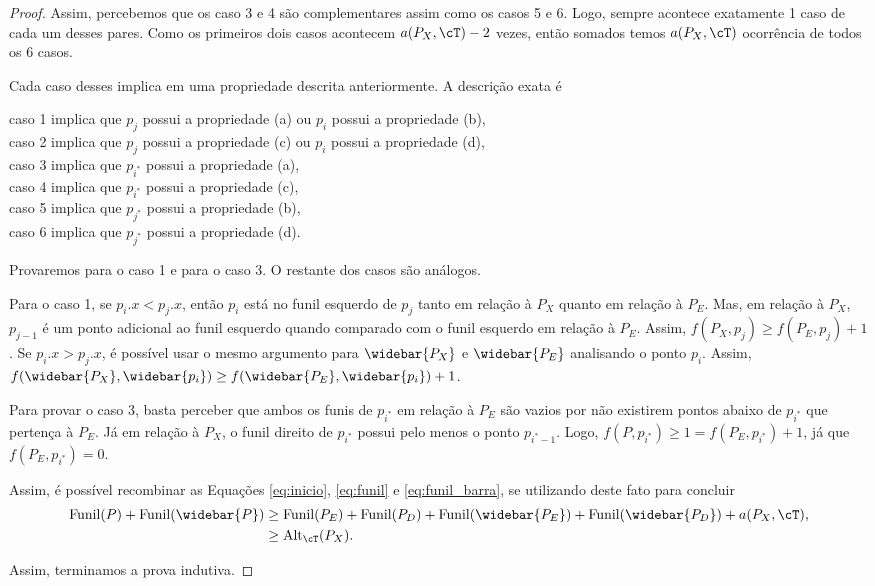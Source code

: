 \begin{proof}
    Assim, percebemos que os caso 3 e 4 são complementares assim como os casos 5 e 6. Logo, sempre acontece exatamente 1 caso de cada um desses pares. Como os primeiros dois casos acontecem $a(P_X,\cT) - 2$ vezes, então somados temos $a(P_X,\cT)$ ocorrência de todos os 6 casos.

    Cada caso desses implica em uma propriedade descrita anteriormente. A descrição exata é
    \begin{center}
        caso 1 implica que $p_j$ possui a propriedade (a) ou $p_i$ possui a propriedade (b),\\
        caso 2 implica que $p_j$ possui a propriedade (c) ou $p_i$ possui a propriedade (d),\\
        caso 3 implica que $p_{i^{*}}$ possui a propriedade (a),\\
        caso 4 implica que $p_{i^{*}}$ possui a propriedade (c),\\
        caso 5 implica que $p_{j^{*}}$ possui a propriedade (b),\\
        caso 6 implica que $p_{j^{*}}$ possui a propriedade (d).
    \end{center}

    Provaremos para o caso 1 e para o caso 3. O restante dos casos são análogos.

    Para o caso 1, se $p_i.x < p_j.x$, então $p_i$ está no funil esquerdo de $p_j$ tanto em relação à $P_X$ quanto em relação à $P_E$. Mas, em relação à $P_X$, $p_{j-1}$ é um ponto adicional ao funil esquerdo quando comparado com o funil esquerdo em relação à $P_E$. Assim, $f(P_X,p_j) \geq f(P_E,p_j) + 1$.
    Se $p_i.x > p_j.x$, é possível usar o mesmo argumento para $\widebar{P_X}$ e $\widebar{P_E}$ analisando o ponto $p_i$. Assim, $f(\widebar{P_X},\widebar{p_i}) \geq f(\widebar{P_E},\widebar{p_i}) + 1$.

    Para provar o caso 3, basta perceber que ambos os funis de $p_{i^{*}}$ em relação à $P_E$ são vazios por não existirem pontos abaixo de $p_{i^{*}}$ que pertença à $P_E$. Já em relação à $P_X$, o funil direito de $p_{i^{*}}$ possui pelo menos o ponto $p_{i^{*} - 1}$. Logo, $f(P,p_{i^{*}}) \geq 1 = f(P_E,p_{i^{*}}) + 1$, já que $f(P_E,p_{i^{*}}) = 0$. 

    Assim, é possível recombinar as Equações \ref{eq:inicio}, \ref{eq:funil} e \ref{eq:funil_barra}, se utilizando deste fato para concluir
    \begin{align*}
        \text{Funil}(P) + \text{Funil}(\widebar{P}) &\geq \text{Funil}(P_E) + \text{Funil}(P_D) + \text{Funil}(\widebar{P_E}) + \text{Funil}(\widebar{P_D}) + a(P_X,\cT), \notag \\
        &\geq \text{Alt}_{\cT}(P_X).
    \end{align*}

    Assim, terminamos a prova indutiva.
\end{proof}


